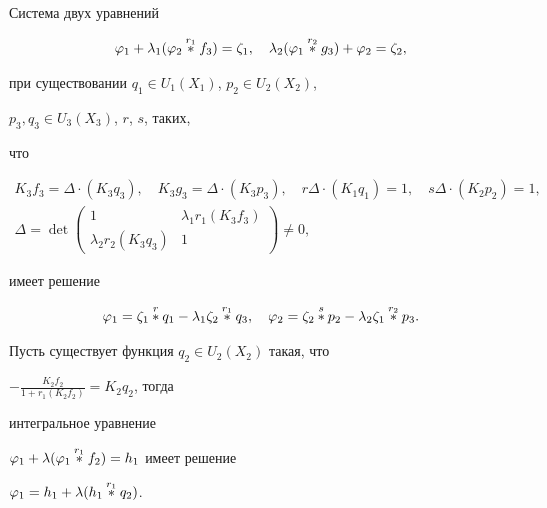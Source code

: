 \begin{cor}


Система двух уравнений


$$


\varphi_1+\lambda_1(\varphi_2\up{r_1}{}f_3)=\zeta_1,\quad


\lambda_2(\varphi_1\up{r_2}{}g_3)+\varphi_2=\zeta_2,


$$


при существовании $q_1\in U_1(X_1)$, $p_2\in U_2(X_2)$,


$p_3,q_3\in U_3(X_3)$, $r$, $s$, таких,


что


\begin{gather*}


K_3f_3=\Delta\cdot(K_3q_3),\quad K_3g_3=\Delta\cdot(K_3p_3),\quad


r\Delta\cdot(K_1q_1)=1,\quad s\Delta\cdot(K_2p_2)=1,\\


\Delta=\det


\begin{pmatrix}


1 & \lambda_1r_1(K_3f_3)\\


\lambda_2r_2(K_3q_3) & 1


\end{pmatrix}


\ne 0,


\end{gather*}


имеет решение


$$


\varphi_1=\zeta_1\up{r}{}q_1-\lambda_1\zeta_2\up{r_1}{}q_3,\quad


\varphi_2=\zeta_2\up{s}{}p_2-\lambda_2\zeta_1\up{r_2}{}p_3.


$$


\end{cor}





\begin{cor}


Пусть существует функция $q_2\in U_2(X_2)$ такая, что


$-\frac{K_2f_2}{1+r_1(K_2f_2)}=K_2q_2$, тогда


интегральное уравнение


$\varphi_1+\lambda(\varphi_1\overset{r_1}{\ast}{}f_2)=h_1$ имеет решение


$\varphi_1=h_1+\lambda(h_1\overset{r_1}{\ast}{}q_2)$.


\end{cor}





